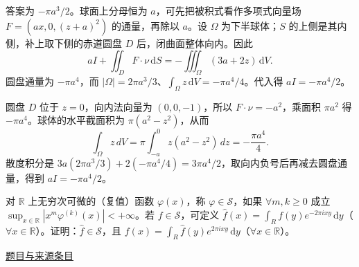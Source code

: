 \documentclass[12pt,fontset=fandol]{ctexart}
\begin{document}
\begin{solve}\label{ans:fin08-hi:3}

答案为 $-\pi a^3/2$。球面上分母恒为 $a$，可先把被积式看作多项式向量场 $F=(ax,0,(z+a)^2)$ 的通量，再除以 $a$。设 $\Omega$ 为下半球体；$S$ 的上侧是其内侧，补上取下侧的赤道圆盘 $D$ 后，闭曲面整体向内。因此
\[
aI+\iint_DF\cdot\nu\,\mathrm dS=-\iiint_\Omega(3a+2z)\,\mathrm dV.
\]
圆盘通量为 $-\pi a^4$，而 $|\Omega|=2\pi a^3/3$、$\int_\Omega z\,\mathrm dV=-\pi a^4/4$。代入得 $aI=-\pi a^4/2$。

圆盘 $D$ 位于 $z=0$，向内法向量为 $(0,0,-1)$，所以 $F\cdot\nu=-a^2$，乘面积 $\pi a^2$ 得 $-\pi a^4$。球体的水平截面积为 $\pi(a^2-z^2)$，从而
\[
\int_\Omega z\,dV=\pi\int_{-a}^0z(a^2-z^2)\,dz=-\frac{\pi a^4}{4}.
\]
散度积分是 $3a(2\pi a^3/3)+2(-\pi a^4/4)=3\pi a^4/2$，取向内负号后再减去圆盘通量，得到 $aI=-\pi a^4/2$。

\end{solve}

\begin{example}[来源序号7]\label{ex:fin08-hi:7}\label{pr:fin08-hi:7}

对 $\mathbb{R}$ 上无穷次可微的（复值）函数 $\varphi(x)$，称 $\varphi\in\mathcal{S}$，如果 $\forall m,k\geq 0$ 成立 $\sup_{x\in\mathbb{R}}\left|x^{m}\varphi^{(k)}(x)\right|<+\infty$。若 $f\in\mathcal{S}$，可定义 $\hat{f}(x)=\int_{R}f(y)e^{-2\pi ixy}\,\mathrm{d}y$（$\forall x\in\mathbb{R}$）。证明：$\hat{f}\in\mathcal{S}$，且 $f(x)=\int_{R}\hat{f}(y)e^{2\pi ixy}\,\mathrm{d}y$（$\forall x\in\mathbb{R}$）。

\par\href{https://github.com/lzxcr/cmc-mathematics/blob/64916fa1fdbc3e444a652eca204d5669058ee321/src/problems/finals/08/07.md}{题目与来源条目}

\end{example}
\end{document}
